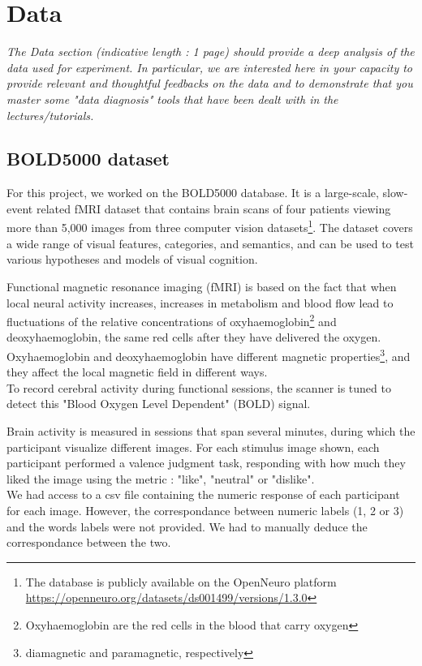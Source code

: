 \section{Data}
\textit{The Data section (indicative length : 1 page) should provide a deep analysis of the data used for experiment. In particular, we are interested here in your capacity to provide relevant and thoughtful feedbacks on the data and to demonstrate that you master some "data diagnosis" tools that have been dealt with in the lectures/tutorials.}



\subsection{BOLD5000 dataset}

For this project, we worked on the BOLD5000 database\cite{chang_bold5000_2019}. It is a large-scale, slow-event related fMRI dataset that contains brain scans of four patients viewing more than 5,000 images from three computer vision datasets\footnote{The database is publicly available on the OpenNeuro platform \url{https://openneuro.org/datasets/ds001499/versions/1.3.0}}. The dataset covers a wide range of visual features, categories, and semantics, and can be used to test various hypotheses and models of visual cognition. 

Functional magnetic resonance imaging (fMRI) is based on the fact that when local neural activity increases, increases in metabolism and blood flow lead to fluctuations of the relative concentrations of oxyhaemoglobin\footnote{Oxyhaemoglobin are the red cells in the blood that carry oxygen} and deoxyhaemoglobin, the same red cells after they have delivered the oxygen. \\
Oxyhaemoglobin and deoxyhaemoglobin have different magnetic properties\footnote{diamagnetic and paramagnetic, respectively}, and they affect the local magnetic field in different ways.\\
To record cerebral activity during functional sessions, the scanner is tuned to detect this "Blood Oxygen Level Dependent" (BOLD) signal. 

Brain activity is measured in sessions that span several minutes, during which the participant visualize different images. For each stimulus image shown, each participant performed a valence judgment task, responding with how much they liked the image using the metric : "like", "neutral" or "dislike".\\
We had access to a csv file containing the numeric response of each participant for each image. However, the correspondance between numeric labels (1, 2 or 3) and the words labels were not provided. We had to manually deduce the correspondance between the two.


